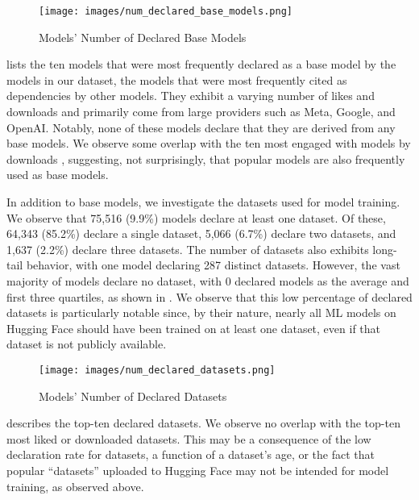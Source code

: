 \begin{figure}[t]
\centering
\texttt{[image: images/num\_declared\_base\_models.png]}
\caption{Models' Number of Declared Base Models}
\label{fig:num_declared_base_models}
\end{figure}



 lists the ten models that were most frequently declared as a base model by the models in our dataset, \ie the models that were most frequently cited as dependencies by other models. They exhibit a varying number of likes and downloads and primarily come from large providers such as Meta, Google, and OpenAI. Notably, none of these models declare that they are derived from any base models. We observe some overlap with the ten most engaged with models by downloads%
, suggesting, not surprisingly, that popular models are also frequently used as base models. %

In addition to base models, we investigate the datasets used for model training. We observe that 75,516 (9.9\%) models declare at least one dataset. Of these, 64,343 (85.2\%) declare a single dataset, 5,066 (6.7\%) declare two datasets, and 1,637 (2.2\%) declare three datasets. The number of datasets also exhibits long-tail behavior, with one model declaring 287 distinct datasets. However, the vast majority of models declare no dataset, with 0 declared models as the average and first three quartiles, as shown in . We observe that this low percentage of declared datasets is particularly notable since, by their nature, nearly all ML models on Hugging Face should have been trained on at least one dataset, even if that dataset is not publicly available. %



\begin{figure}[t]
\centering
\texttt{[image: images/num\_declared\_datasets.png]}
\caption{Models' Number of Declared Datasets}
\label{fig:num_declared_datasets}
\end{figure}



 describes the top-ten declared datasets. We observe no overlap with the top-ten most liked or downloaded datasets.  This may be a consequence of the low declaration rate for datasets, a function of a dataset's age, or the fact that popular ``datasets'' uploaded to Hugging Face may not be intended for model training, as observed above.

